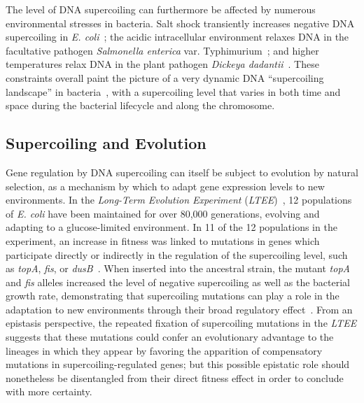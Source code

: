 The level of DNA supercoiling can furthermore be affected by numerous environmental stresses in bacteria.
Salt shock transiently increases negative DNA supercoiling in \emph{E. coli}~\citep{hsieh1991}; the acidic intracellular environment relaxes DNA in the facultative pathogen \emph{Salmonella enterica} var. Typhimurium~\citep{marshall2000}; and higher temperatures relax DNA in the plant pathogen \emph{Dickeya dadantii}~\citep{herault2014}.
These constraints overall paint the picture of a very dynamic DNA ``supercoiling landscape'' in bacteria~\citep{visser2022}, with a supercoiling level that varies in both time and space during the bacterial lifecycle and along the chromosome.

\subsection{Supercoiling and Evolution}

Gene regulation by DNA supercoiling can itself be subject to evolution by natural selection, as a mechanism by which to adapt gene expression levels to new environments.
In the \emph{Long-Term Evolution Experiment} (\emph{LTEE})~\citep{lenski1991}, 12 populations of \emph{E. coli} have been maintained for over 80,000 generations, evolving and adapting to a glucose-limited environment.
In 11 of the 12 populations in the experiment, an increase in fitness was linked to mutations in genes which participate directly or indirectly in the regulation of the supercoiling level, such as \emph{topA}, \emph{fis}, or \emph{dusB}~\citep{crozat2010}.
When inserted into the ancestral strain, the mutant \emph{topA} and \emph{fis} alleles increased the level of negative supercoiling as well as the bacterial growth rate, demonstrating
that supercoiling mutations can play a role in the adaptation to new environments through their broad regulatory effect~\citep{crozat2005}.
From an epistasis perspective, the repeated fixation of supercoiling mutations in the \emph{LTEE} suggests that these mutations could confer an evolutionary advantage to the lineages in which they appear by favoring the apparition of compensatory mutations in supercoiling-regulated genes; but this possible epistatic role should nonetheless be disentangled from their direct fitness effect in order to conclude with more certainty.

